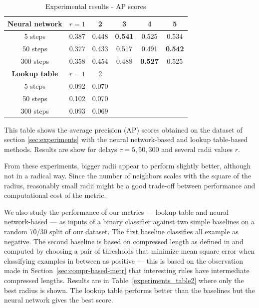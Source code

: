\begin{table}[t!]
  \renewcommand{\arraystretch}{1}
  \caption{Experimental results - AP scores}
  \label{experiments_table}
  \centering
  \begin{tabular}{c|c|c|c|c|c}
    \toprule
    \bfseries Neural network& $r=1$ &  2  & 3  & 4 & 5\\
    \midrule
    5 steps & 0.387 & 0.448 & \bfseries 0.541 & 0.525 & 0.534\\
    50 steps & 0.377 & 0.433 & 0.517 & 0.491 & \bfseries 0.542\\
    300 steps &0.358 & 0.454 & 0.488 & \bfseries 0.527 & 0.525\\
    \midrule
    \bfseries Lookup table& $r=1$ &  2  & & &\\
    \midrule
    5 steps & 0.092 & 0.070&&&\\
    50 steps & 0.102 & 0.070&&&\\
    300 steps & 0.093 & 0.069&&&\\
    \bottomrule
  \end{tabular}

  \begin{flushleft}{This table shows the average precision (AP)
      scores obtained on the dataset of section \ref{sec:experiments} with the
      neural network-based and lookup table-based methods. Results are show for
      delays $\tau = 5, 50, 300$ and several radii values $r$.}\end{flushleft}
\end{table}

From these experiments, bigger radii appear to perform slightly better, although
not in a radical way. Since the number of neighbors scales with the square of
the radius, reasonably small radii might be a good trade-off between performance
and computational cost of the metric.

We also study the performance of our metrics --- lookup table and neural
network-based --- as inputs of a binary classifier against two simple baselines
on a random 70/30 split of our dataset. The first baseline classifies all
example as negative. The second baseline is based on compressed length as
defined in \parencite{zenil_compression-based_2010} and computed by choosing a pair
of thresholds that minimize mean square error when classifying examples in
between as positive --- this is based on the observation made in
Section~\ref{sec:compr-based-metr} that interesting rules have intermediate
compressed lengths. Results are in Table~\ref{experiments_table2} where only the
best radius is shown. The lookup table performs better than the baselines but
the neural network gives the best score.

